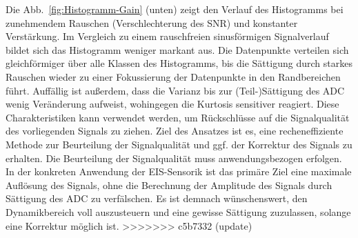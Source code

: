 Die Abb.~\ref{fig:Histogramm-Gain} (unten) zeigt den Verlauf des Histogramms bei zunehmendem Rauschen (Verschlechterung des SNR) und konstanter Verstärkung. Im Vergleich zu einem rauschfreien sinusförmigen Signalverlauf bildet sich das Histogramm weniger markant aus. Die Datenpunkte verteilen sich gleichförmiger über alle Klassen des Histogramms, bis die Sättigung durch starkes Rauschen wieder zu einer Fokussierung der Datenpunkte in den Randbereichen führt. Auffällig ist außerdem, dass die Varianz bis zur (Teil-)Sättigung des ADC wenig Veränderung aufweist, wohingegen die Kurtosis sensitiver reagiert. Diese Charakteristiken kann verwendet werden, um Rückschlüsse auf die Signalqualität des vorliegenden Signals zu ziehen. Ziel des Ansatzes ist es, eine recheneffiziente Methode zur Beurteilung der Signalqualität und ggf. der Korrektur des Signals zu erhalten. Die Beurteilung der Signalqualität muss anwendungsbezogen erfolgen. In der konkreten Anwendung der EIS-Sensorik ist das primäre Ziel eine maximale Auflösung des Signals, ohne die Berechnung der Amplitude des Signals durch Sättigung des ADC zu verfälschen. Es ist demnach wünschenswert, den Dynamikbereich voll auszusteuern und eine gewisse Sättigung zuzulassen, solange eine Korrektur möglich ist.
>>>>>>> c5b7332 (update)


%
